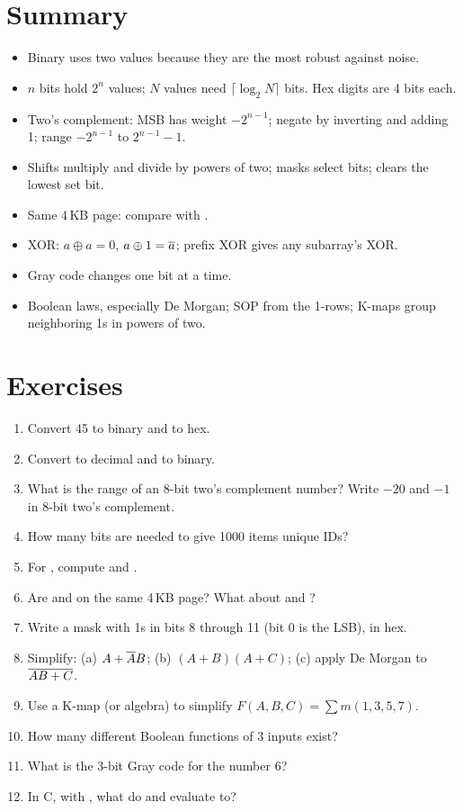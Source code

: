 \section{Summary}

\begin{itemize}
  \item Binary uses two values because they are the most robust against noise.
  \item $n$ bits hold $2^n$ values; $N$ values need $\lceil\log_2 N\rceil$ bits. Hex digits are 4 bits each.
  \item Two's complement: MSB has weight $-2^{n-1}$; negate by inverting and adding 1; range $-2^{n-1}$ to $2^{n-1}-1$.
  \item Shifts multiply and divide by powers of two; masks select bits;  clears the lowest set bit.
  \item Same 4\,KB page: compare  with .
  \item XOR: $a \oplus a = 0$, $a \oplus 1 = \overline{a}$; prefix XOR gives any subarray's XOR.
  \item Gray code changes one bit at a time.
  \item Boolean laws, especially De Morgan; SOP from the 1-rows; K-maps group neighboring 1s in powers of two.
\end{itemize}

\section{Exercises}

\begin{enumerate}
  \item Convert 45 to binary and to hex.
  \item Convert  to decimal and to binary.
  \item What is the range of an 8-bit two's complement number? Write $-20$ and $-1$ in 8-bit two's complement.
  \item How many bits are needed to give 1000 items unique IDs?
  \item For , compute  and .
  \item Are  and  on the same 4\,KB page? What about  and ?
  \item Write a mask with 1s in bits 8 through 11 (bit 0 is the LSB), in hex.
  \item Simplify: (a) $A + \overline{A}B$; (b) $(A+B)(A+C)$; (c) apply De Morgan to $\overline{AB + C}$.
  \item Use a K-map (or algebra) to simplify $F(A,B,C) = \sum m(1,3,5,7)$.
  \item How many different Boolean functions of 3 inputs exist?
  \item What is the 3-bit Gray code for the number 6?
  \item In C, with , what do  and  evaluate to?
\end{enumerate}

